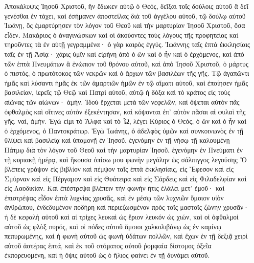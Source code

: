 \begin{pages}
    \begin{Rightside}
        \beginnumbering
		Ἀποκάλυψις Ἰησοῦ Χριστοῦ, ἣν ἔδωκεν αὐτῷ ὁ Θεός, δεῖξαι τοῖς δούλοις αὐτοῦ ἃ δεῖ γενέσθαι ἐν τάχει, καὶ ἐσήμανεν ἀποστείλας διὰ τοῦ ἀγγέλου αὐτοῦ, τῷ δούλῳ αὐτοῦ Ἰωάνῃ, ὃς ἐμαρτύρησεν τὸν λόγον τοῦ Θεοῦ καὶ τὴν μαρτυρίαν Ἰησοῦ Χριστοῦ, ὅσα εἶδεν. Μακάριος ὁ ἀναγινώσκων καὶ οἱ ἀκούοντες τοὺς λόγους τῆς προφητείας καὶ τηροῦντες τὰ ἐν αὐτῇ γεγραμμένα· ὁ γὰρ καιρὸς ἐγγύς.
		\pend
		\pstart
			Ἰωάννης ταῖς ἑπτὰ ἐκκλησίαις ταῖς ἐν τῇ Ἀσίᾳ· χάρις ὑμῖν καὶ εἰρήνη ἀπὸ ὁ ὢν καὶ ὁ ἦν καὶ ὁ ἐρχόμενος, καὶ ἀπὸ τῶν ἑπτὰ Πνευμάτων ἃ ἐνώπιον τοῦ θρόνου αὐτοῦ, καὶ ἀπὸ Ἰησοῦ Χριστοῦ, ὁ μάρτυς ὁ πιστός, ὁ πρωτότοκος τῶν νεκρῶν καὶ ὁ ἄρχων τῶν βασιλέων τῆς γῆς.
		\pend
		\pstart
			Τῷ ἀγαπῶντι ἡμᾶς καὶ λύσαντι ἡμᾶς ἐκ τῶν ἁμαρτιῶν ἡμῶν ἐν τῷ αἵματι αὐτοῦ, καὶ ἐποίησεν ἡμᾶς βασιλείαν, ἱερεῖς τῷ Θεῷ καὶ Πατρὶ αὐτοῦ, αὐτῷ ἡ δόξα καὶ τὸ κράτος εἰς τοὺς αἰῶνας τῶν αἰώνων· ἀμήν.
		\pend
		\pstart	
			Ἰδοὺ ἔρχεται μετὰ τῶν νεφελῶν, καὶ ὄψεται αὐτὸν πᾶς ὀφθαλμὸς καὶ οἵτινες αὐτὸν ἐξεκέντησαν, καὶ κόψονται ἐπ’ αὐτὸν πᾶσαι αἱ φυλαὶ τῆς γῆς. ναί, ἀμήν.
		\pend
		\pstart
			Ἐγώ εἰμι τὸ Ἄλφα καὶ τὸ Ὦ, λέγει Κύριος ὁ Θεός, ὁ ὢν καὶ ὁ ἦν καὶ ὁ ἐρχόμενος, ὁ Παντοκράτωρ.		
			\pend
		\pstart
			Ἐγὼ Ἰωάνης, ὁ ἀδελφὸς ὑμῶν καὶ συνκοινωνὸς ἐν τῇ θλίψει καὶ βασιλείᾳ καὶ ὑπομονῇ ἐν Ἰησοῦ, ἐγενόμην ἐν τῇ νήσῳ τῇ καλουμένῃ Πάτμῳ διὰ τὸν λόγον τοῦ Θεοῦ καὶ τὴν μαρτυρίαν Ἰησοῦ. ἐγενόμην ἐν Πνεύματι ἐν τῇ κυριακῇ ἡμέρᾳ, καὶ ἤκουσα ὀπίσω μου φωνὴν μεγάλην ὡς σάλπιγγος λεγούσης Ὃ βλέπεις γράψον εἰς βιβλίον καὶ πέμψον ταῖς ἑπτὰ ἐκκλησίαις, εἰς Ἔφεσον καὶ εἰς Σμύρναν καὶ εἰς Πέργαμον καὶ εἰς Θυάτειρα καὶ εἰς Σάρδεις καὶ εἰς Φιλαδελφίαν καὶ εἰς Λαοδικίαν. 
		\pend
		\pstart
			Καὶ ἐπέστρεψα βλέπειν τὴν φωνὴν ἥτις ἐλάλει μετ’ ἐμοῦ· καὶ ἐπιστρέψας εἶδον ἑπτὰ λυχνίας χρυσᾶς, καὶ ἐν μέσῳ τῶν λυχνιῶν ὅμοιον υἱὸν ἀνθρώπου, ἐνδεδυμένον ποδήρη καὶ περιεζωσμένον πρὸς τοῖς μαστοῖς ζώνην χρυσᾶν· ἡ δὲ κεφαλὴ αὐτοῦ καὶ αἱ τρίχες λευκαὶ ὡς ἔριον λευκόν ὡς χιών, καὶ οἱ ὀφθαλμοὶ αὐτοῦ ὡς φλὸξ πυρός, καὶ οἱ πόδες αὐτοῦ ὅμοιοι χαλκολιβάνῳ ὡς ἐν καμίνῳ πεπυρωμένης, καὶ ἡ φωνὴ αὐτοῦ ὡς φωνὴ ὑδάτων πολλῶν, καὶ ἔχων ἐν τῇ δεξιᾷ χειρὶ αὐτοῦ ἀστέρας ἑπτά, καὶ ἐκ τοῦ στόματος αὐτοῦ ῥομφαία δίστομος ὀξεῖα ἐκπορευομένη, καὶ ἡ ὄψις αὐτοῦ ὡς ὁ ἥλιος φαίνει ἐν τῇ δυνάμει αὐτοῦ. 

\end{Rightside}
\end{pages}
